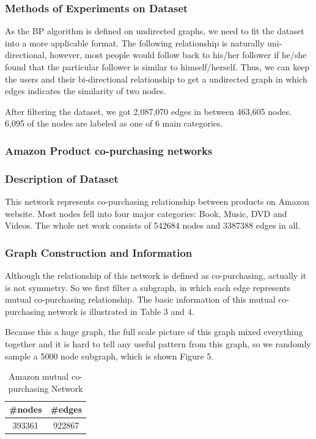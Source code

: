 \subsubsection*{Methods of Experiments on Dataset}
As the BP algorithm is defined on undirected graphs, we need to fit the dataset into a more applicable format.
The following relationship is naturally uni-directional, however, most people would follow back to his/her follower if he/she found that the particular follower is similar to himself/herself.
Thus, we can keep the users and their bi-directional relationship to get a undirected graph in which edges indicates the similarity of two nodes.

After filtering the dataset, we got 2,087,070 edges in between 463,605 nodes. 6,095 of the nodes are labeled as one of 6 main categories.



\subsubsection{Amazon Product co-purchasing networks}

\subsubsection*{Description of Dataset}
This network represents co-purchasing relationship between products on Amazon website. Most nodes fell into four major categories: Book, Music, DVD and Videos. The whole net work consists of 542684 nodes and 3387388 edges in all.


\subsubsection*{Graph Construction and Information}
Although the relationship of this network is defined as co-purchasing, actually it is not symmetry. So we first filter a subgraph, in which each edge represents mutual co-purchasing relationship. The basic information of this mutual co-purchasing network is illustrated in Table 3 and 4. 

Because this a huge graph, the full scale picture of this graph mixed everything together and it is hard to tell any useful pattern from this graph, so we randomly sample a 5000 node subgraph, which is shown Figure 5.

\begin{table}[!ht]
\centering
\begin{tabular}{cc}
\toprule
\textbf{\#nodes} & \textbf{\#edges}\\
\midrule
393361 & 922867\\
\bottomrule
\end{tabular}
\caption{Amazon mutual co-purchasing Network}
\end{table}

